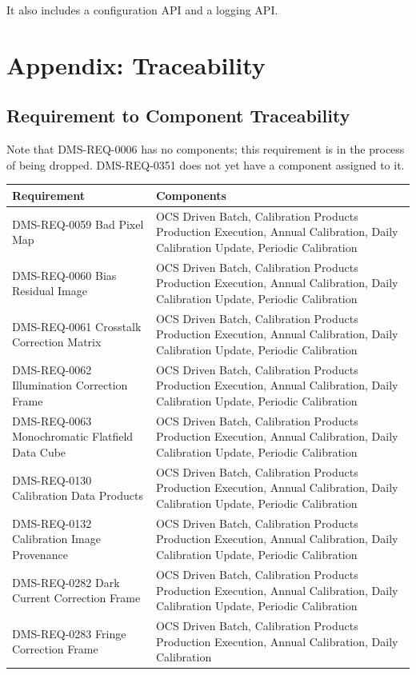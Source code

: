 \documentclass[]{article}
\begin{document}
It also includes a configuration API and a logging API.

\section{Appendix: Traceability}\label{appendix-traceability}

\subsection{Requirement to Component
Traceability}\label{requirement-to-component-traceability}

Note that DMS-REQ-0006 has no components; this requirement is in the
process of being dropped. DMS-REQ-0351 does not yet have a component
assigned to it.

\begin{longtable}[]{@{}ll@{}}
\toprule
Requirement & Components\tabularnewline
\midrule
\endhead
DMS-REQ-0059 Bad Pixel Map & OCS Driven Batch, Calibration Products
Production Execution, Annual Calibration, Daily Calibration Update,
Periodic Calibration\tabularnewline
DMS-REQ-0060 Bias Residual Image & OCS Driven Batch, Calibration
Products Production Execution, Annual Calibration, Daily Calibration
Update, Periodic Calibration\tabularnewline
DMS-REQ-0061 Crosstalk Correction Matrix & OCS Driven Batch, Calibration
Products Production Execution, Annual Calibration, Daily Calibration
Update, Periodic Calibration\tabularnewline
DMS-REQ-0062 Illumination Correction Frame & OCS Driven Batch,
Calibration Products Production Execution, Annual Calibration, Daily
Calibration Update, Periodic Calibration\tabularnewline
DMS-REQ-0063 Monochromatic Flatfield Data Cube & OCS Driven Batch,
Calibration Products Production Execution, Annual Calibration, Daily
Calibration Update, Periodic Calibration\tabularnewline
DMS-REQ-0130 Calibration Data Products & OCS Driven Batch, Calibration
Products Production Execution, Annual Calibration, Daily Calibration
Update, Periodic Calibration\tabularnewline
DMS-REQ-0132 Calibration Image Provenance & OCS Driven Batch,
Calibration Products Production Execution, Annual Calibration, Daily
Calibration Update, Periodic Calibration\tabularnewline
DMS-REQ-0282 Dark Current Correction Frame & OCS Driven Batch,
Calibration Products Production Execution, Annual Calibration, Daily
Calibration Update, Periodic Calibration\tabularnewline
DMS-REQ-0283 Fringe Correction Frame & OCS Driven Batch, Calibration
Products Production Execution, Annual Calibration, Daily Calibration

\end{longtable}
\end{document}
